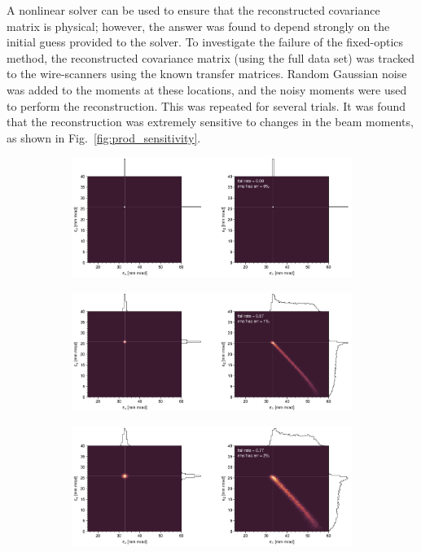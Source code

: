 A nonlinear solver can be used to ensure that the reconstructed covariance matrix is physical; however, the answer was found to depend strongly on the initial guess provided to the solver. To investigate the failure of the fixed-optics method, the reconstructed covariance matrix (using the full data set) was tracked to the wire-scanners using the known transfer matrices. Random Gaussian noise was added to the moments at these locations, and the noisy moments were used to perform the reconstruction. This was repeated for several trials. It was found that the reconstruction was extremely sensitive to changes in the beam moments, as shown in Fig.~\ref{fig:prod_sensitivity}.
%
\begin{figure}[!p]
    \centering
    \begin{subfigure}{1.0\textwidth}
        \includegraphics[width=\textwidth]{Images/chapter4/prod_sensitivity1.png}
    \end{subfigure}
    \vfill
    \vspace*{0.5cm}
    \vfill
    \begin{subfigure}{1.0\textwidth}
        \includegraphics[width=\textwidth]{Images/chapter4/prod_sensitivity2.png}
    \end{subfigure}
    \vfill
    \vspace*{0.5cm}
    \vfill
    \begin{subfigure}{1.0\textwidth}
        \includegraphics[width=\textwidth]{Images/chapter4/prod_sensitivity3.png}

\end{subfigure}
\end{figure}
